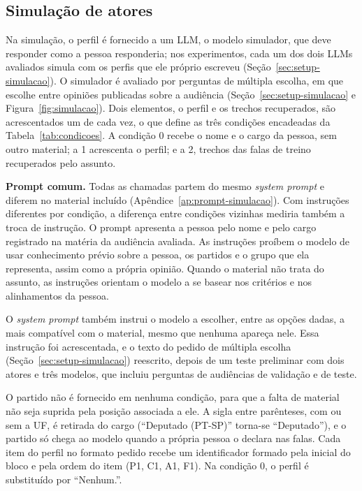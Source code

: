 \subsection{Simulação de atores}
\label{sec:metodo-simulacao}

Na simulação, o perfil é fornecido a um LLM, o modelo simulador, que deve responder como a pessoa
responderia; nos experimentos, cada um dos dois LLMs avaliados simula com os perfis que ele próprio
escreveu (Seção~\ref{sec:setup-simulacao}). O simulador é avaliado
por perguntas de múltipla escolha, em que escolhe entre opiniões publicadas sobre a audiência
(Seção~\ref{sec:setup-simulacao} e Figura~\ref{fig:simulacao}). Dois elementos, o perfil e os trechos recuperados, são
acrescentados um de cada vez, o que define as três condições encadeadas da
Tabela~\ref{tab:condicoes}. A condição 0 recebe o nome e o cargo da pessoa, sem outro material; a 1
acrescenta o perfil; e a 2, trechos das falas de treino recuperados pelo assunto.



\textbf{Prompt comum.} Todas as chamadas partem do mesmo \textit{system prompt} e diferem no material
incluído (Apêndice~\ref{ap:prompt-simulacao}). Com instruções diferentes por condição, a diferença
entre condições vizinhas mediria também a troca de instrução. O prompt apresenta a pessoa pelo nome
e pelo cargo registrado na matéria da audiência avaliada. As instruções proíbem o modelo de usar
conhecimento prévio sobre a pessoa, os partidos e o grupo que ela representa, assim como a própria
opinião. Quando o material não trata do assunto, as instruções orientam o modelo a se basear nos
critérios e nos alinhamentos da pessoa.

O \textit{system prompt} também instrui o modelo a escolher, entre as opções dadas, a mais compatível com
o material, mesmo que nenhuma apareça nele. Essa instrução foi acrescentada, e o texto do pedido de
múltipla escolha (Seção~\ref{sec:setup-simulacao}) reescrito, depois de um teste preliminar com dois
atores e três modelos, que incluiu perguntas de audiências de validação e de teste.

O partido não é fornecido em nenhuma condição, para que a falta de material não seja suprida pela
posição associada a ele. A sigla entre parênteses, com ou sem a UF, é retirada do cargo (``Deputado
(PT-SP)'' torna-se ``Deputado''), e o partido só chega ao modelo quando a própria pessoa o declara
nas falas. Cada item do perfil no formato pedido recebe um identificador formado pela inicial do
bloco e pela ordem do item (P1, C1, A1, F1). Na condição 0, o perfil é substituído por ``Nenhum.''.

